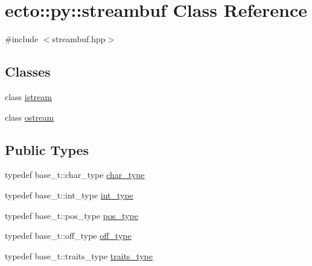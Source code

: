 \hypertarget{classecto_1_1py_1_1streambuf}{\section{ecto\-:\-:py\-:\-:streambuf \-Class \-Reference}
\label{classecto_1_1py_1_1streambuf}
}


{\ttfamily \#include $<$streambuf.\-hpp$>$}

\subsection*{\-Classes}
\begin{DoxyCompactItemize}
\item 
class \hyperlink{classecto_1_1py_1_1streambuf_1_1istream}{istream}
\item 
class \hyperlink{classecto_1_1py_1_1streambuf_1_1ostream}{ostream}
\end{DoxyCompactItemize}
\subsection*{\-Public \-Types}
\begin{DoxyCompactItemize}
\item 
typedef base\-\_\-t\-::char\-\_\-type \hyperlink{classecto_1_1py_1_1streambuf_acd255be6a50678c600c431c5bea7bc7b}{char\-\_\-type}
\item 
typedef base\-\_\-t\-::int\-\_\-type \hyperlink{classecto_1_1py_1_1streambuf_a1bfd3d3f54b7b91a5ea54f980436a617}{int\-\_\-type}
\item 
typedef base\-\_\-t\-::pos\-\_\-type \hyperlink{classecto_1_1py_1_1streambuf_afdd3f60ff0d0b2f4645742690b7d27dd}{pos\-\_\-type}
\item 
typedef base\-\_\-t\-::off\-\_\-type \hyperlink{classecto_1_1py_1_1streambuf_aa01772d1599fc51089a209a69fcab7c7}{off\-\_\-type}
\item 
typedef base\-\_\-t\-::traits\-\_\-type \hyperlink{classecto_1_1py_1_1streambuf_aaf8a5185360343bec29d804d5b416417}{traits\-\_\-type}
\end{DoxyCompactItemize}
